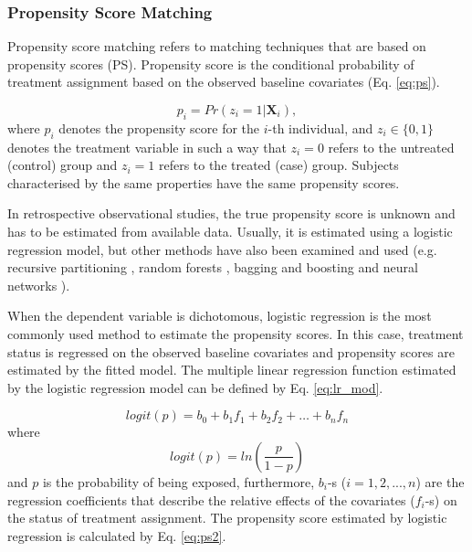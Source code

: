 \subsubsection{Propensity Score Matching}
\label{sec:psm}

Propensity score matching refers to matching techniques that are based on propensity scores (PS). Propensity score is the conditional probability of treatment assignment based on the observed baseline covariates (Eq. \ref{eq:ps}).

\begin{equation}
	\label{eq:ps}
	p_i=Pr(z_i = 1|\textbf{X}_i),
\end{equation}
where $p_i$ denotes the propensity score for the $i$-th individual, and $z_i \in \{0, 1\}$ denotes the treatment variable in such a way that $z_i=0$ refers to the untreated (control) group and $z_i=1$ refers to the treated (case) group. Subjects characterised by the same properties have the same propensity scores. 

In retrospective observational studies, the true propensity score is unknown and has to be estimated from available data. Usually, it is estimated using a logistic regression model, but other methods have also been examined and used (e.g. recursive partitioning \cite{setoguchi2008evaluating}, random forests \cite{zhao2016propensity}, bagging and boosting \cite{mccaffrey2004propensity, lee2010improving} and neural networks \cite{cavuto2006propensity, austin2007comparison}).

When the dependent variable is dichotomous, logistic regression is the most commonly used method to estimate the propensity scores. In this case, treatment status is regressed on the observed baseline covariates and propensity scores are estimated by the fitted model. The multiple linear regression function estimated by the logistic regression model can be defined by Eq. \ref{eq:lr_mod}.

\begin{equation}
	\label{eq:lr_mod}
	logit(p)=b_0+b_1f_1+b_2f_2+\dots+b_nf_n
\end{equation}
where
\begin{equation}
	\label{eq:logit}
	logit(p)=ln\left(\frac{p}{1-p}\right)
\end{equation}
and $p$ is the probability of being exposed, furthermore, $b_i$-s ($i=1, 2, ..., n$) are the regression coefficients that describe the relative effects of the covariates ($f_i$-s) on the status of treatment assignment. The propensity score estimated by logistic regression is calculated by Eq. \ref{eq:ps2}.

